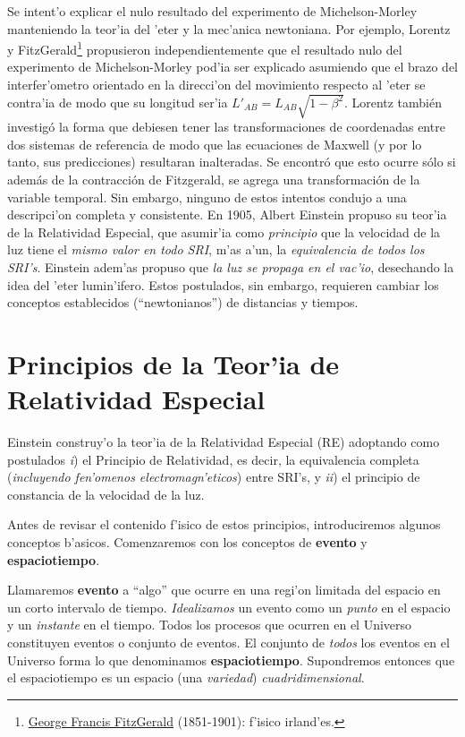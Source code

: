 Se intent'o explicar el nulo resultado del experimento de Michelson-Morley manteniendo la teor'ia del 'eter y la mec'anica newtoniana. Por ejemplo, Lorentz y FitzGerald\footnote{\href{{http://es.wikipedia.org/wiki/George_Francis_FitzGerald}}{George Francis FitzGerald} (1851-1901): f'isico irland'es.} propusieron independientemente que el resultado nulo del experimento de Michelson-Morley pod'ia ser explicado asumiendo que el brazo del interfer'ometro orientado en la direcci'on del movimiento respecto al 'eter se contra'ia de modo que su longitud ser'ia $L'_{AB}=L_{AB}\sqrt{1-\beta^2}$. Lorentz también investigó la forma que debiesen tener las transformaciones de coordenadas entre dos sistemas de referencia de modo que las ecuaciones de Maxwell (y por lo tanto, sus predicciones) resultaran inalteradas. Se encontró que esto ocurre sólo si además de la contracción de Fitzgerald, se agrega una transformación de la variable temporal. Sin embargo, ninguno de estos intentos condujo a una descripci'on completa y consistente. En 1905, Albert Einstein propuso su teor'ia de la Relatividad Especial, que asumir'ia como \textit{principio} que la velocidad de la luz tiene el \textit{mismo valor en todo SRI}, m'as a'un, la \textit{equivalencia de todos los SRI's}. Einstein adem'as propuso que \textit{la luz se propaga en el vac'io}, desechando la idea del 'eter lumin'ifero. Estos postulados, sin embargo, requieren cambiar los conceptos establecidos (``newtonianos'') de distancias y tiempos.

\section{Principios de la Teor'ia de Relatividad Especial}
Einstein construy'o la teor'ia de la Relatividad Especial (RE) adoptando como postulados \textit{i}) el Principio de Relatividad, es decir, la equivalencia completa (\textit{incluyendo fen'omenos electromagn'eticos}) entre SRI's,  y \textit{ii}) el principio de constancia de la velocidad de la luz.

Antes de revisar el contenido f'isico de estos principios, introduciremos algunos conceptos b'asicos. Comenzaremos con los conceptos de \textbf{evento} y \textbf{espaciotiempo}.

Llamaremos \textbf{evento} a ``algo'' que ocurre en una regi'on limitada del
espacio en un corto intervalo de tiempo. \textit{Idealizamos} un evento como un \textit{punto} en el espacio y un \textit{instante} en el tiempo. Todos los procesos que ocurren en el Universo constituyen eventos o conjunto de eventos.
El conjunto de \textit{todos} los eventos en el Universo forma lo que
denominamos \textbf{espaciotiempo}. Supondremos entonces que el espaciotiempo es un espacio (una \textit{variedad}) \textit{cuadridimensional}.

